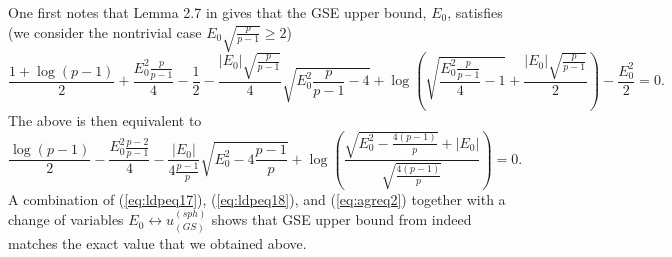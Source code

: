 \documentclass[10pt]{article}
\def\lp{\left (}
\def\rp{\right )}
\begin{document}
One first notes that Lemma 2.7 in \cite{DarMc24} gives that the GSE upper bound, $E_0$, satisfies (we consider the nontrivial case $E_0\sqrt{\frac{p}{p-1}} \geq 2$)
\begin{equation}
\label{eq:agreq1}
 \frac{1+\log(p-1)}{2} + \frac{E^2_0\frac{p}{p-1}}{4} -\frac{1}{2}  - \frac{|E_0|\sqrt{\frac{p}{p-1}}}{4} \sqrt{E_0^2\frac{p}{p-1} - 4 }
 + \log \lp \sqrt{\frac{E_0^2\frac{p}{p-1}}{4} -1 }  + \frac{|E_0|\sqrt{\frac{p}{p-1}}}{2}  \rp   - \frac{E_0^2}{2}
   = 0.
 \end{equation}
The above is then equivalent to
\begin{equation}
\label{eq:agreq2}
 \frac{\log(p-1)}{2} - \frac{E^2_0\frac{p-2}{p-1}}{4}   - \frac{|E_0|}{4\frac{p-1}{p}} \sqrt{E_0^2 - 4\frac{p-1}{p} }
 + \log \lp \frac{\sqrt{E_0^2 - \frac{4(p-1)}{p} }  + |E_0| }{\sqrt{ \frac{4(p-1)}{p} } }  \rp
   = 0.
 \end{equation}
A combination of (\ref{eq:ldpeq17}), (\ref{eq:ldpeq18}), and (\ref{eq:agreq2}) together with a change of variables  $ E_0 \leftrightarrow u^{(sph)}_{(GS)}$ shows that GSE upper bound from \cite{DarMc24} indeed matches the exact value that we obtained above.
\end{document}
